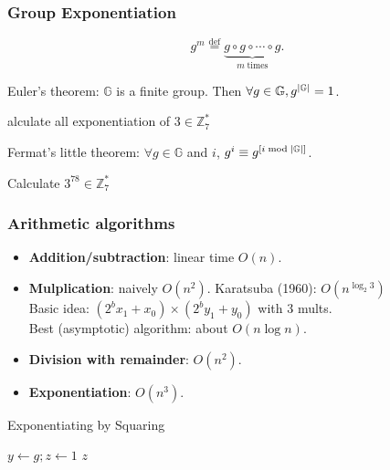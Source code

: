 \begin{frame}\frametitle{Group Exponentiation}
\[ g^m \overset{\text{def}}{=} \underbrace{g\circ g\circ \cdots \circ g}_{m\; \text{times}}. \]
\begin{theorem}
Euler's theorem: $\mathbb{G}$ is a finite group. Then $\forall g \in \mathbb{G}, g^{\lvert\mathbb{G}\rvert}=1$.
\end{theorem}
\begin{exampleblock}{alculate all exponentiation of $3 \in \mathbb{Z}_{7}^*$}
\end{exampleblock}
\begin{corollary}
Fermat's little theorem: $\forall g \in \mathbb{G}$ and $i$, $g^i \equiv g^{[i \bmod {\lvert\mathbb{G}\rvert}]}$.
\end{corollary}
\begin{exampleblock}{Calculate $3^{78} \in \mathbb{Z}_{7}^*$}
\end{exampleblock}
\end{frame}
\begin{frame}\frametitle{Arithmetic algorithms}
\begin{itemize}
\item \textbf{Addition/subtraction}: linear time $O(n)$.
\item \textbf{Mulplication}: naively $O(n^2)$. Karatsuba (1960): $O(n^{\log_2 3})$\\
Basic idea: $(2^bx_1+x_0) \times (2^by_1+ y_0)$ with 3 mults.\\
Best (asymptotic) algorithm: about $O(n\log n)$.
\item \textbf{Division with remainder}: $O(n^2)$.
\item \textbf{Exponentiation}: $O(n^3)$.
\end{itemize}
\begin{algorithm}[H]
\DontPrintSemicolon
\caption{Exponentiating by Squaring}
\BlankLine
$y \gets g; z \gets 1$\;
\Return $z$
\end{algorithm}
\end{frame}
